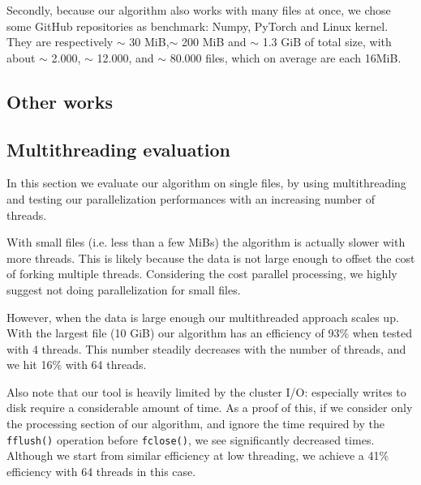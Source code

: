 Secondly, because our algorithm also works with many files at once, we chose some GitHub repositories as benchmark: Numpy, PyTorch and Linux kernel. They are respectively $\sim$ 30 MiB,$\sim$ 200 MiB and $\sim$ 1.3 GiB of total size, with about $\sim$ 2.000, $\sim$ 12.000, and  $\sim$ 80.000 files, which on average are each 16MiB.


\subsection{Other works}

\subsection{Multithreading evaluation}
In this section we evaluate our algorithm on single files, by using multithreading and testing our parallelization performances with an increasing number of threads.

With small files (i.e. less than a few MiBs) the algorithm is actually slower with more threads. This is likely because the data is not large enough to offset the cost of forking multiple threads. Considering the cost parallel processing, we highly suggest not doing parallelization for small files.

However, when the data is large enough our multithreaded approach scales up. With the largest file (10 GiB) our algorithm has an efficiency of 93\% when tested with 4 threads. This number steadily decreases with the number of threads, and we hit 16\% with 64 threads.

Also note that our tool is heavily limited by the cluster I/O: especially writes to disk require a considerable amount of time. As a proof of this, if we consider only the processing section of our algorithm, and ignore the time required by the \verb|fflush()| operation before \verb|fclose()|, we see significantly decreased times. Although we start from similar efficiency at low threading, we achieve a 41\% efficiency with 64 threads in this case. %

